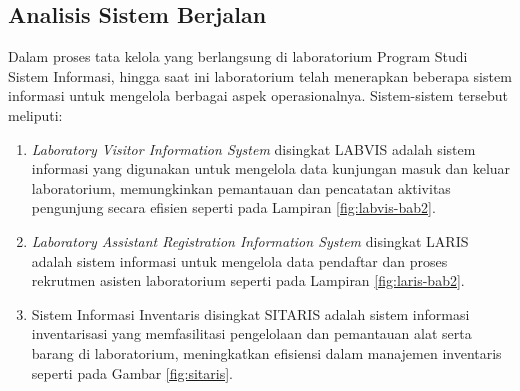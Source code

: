 \subsection{Analisis Sistem Berjalan}
Dalam proses tata kelola yang berlangsung di laboratorium Program Studi Sistem Informasi, hingga saat ini laboratorium telah menerapkan beberapa sistem informasi untuk mengelola berbagai aspek operasionalnya. Sistem-sistem tersebut meliputi:

\begin{enumerate}
	\item \textit{Laboratory Visitor Information System} disingkat LABVIS adalah sistem informasi yang digunakan untuk mengelola data kunjungan masuk dan keluar laboratorium, memungkinkan pemantauan dan pencatatan aktivitas pengunjung secara efisien seperti pada Lampiran \ref{fig:labvis-bab2}.

	\item \textit{Laboratory Assistant Registration Information System} disingkat LARIS adalah sistem informasi untuk mengelola data pendaftar dan proses rekrutmen asisten laboratorium seperti pada Lampiran \ref{fig:laris-bab2}.

	\item Sistem Informasi Inventaris disingkat SITARIS adalah sistem informasi inventarisasi yang memfasilitasi pengelolaan dan pemantauan alat serta barang di laboratorium, meningkatkan efisiensi dalam manajemen inventaris seperti pada Gambar \ref{fig:sitaris}.
\end{enumerate}

